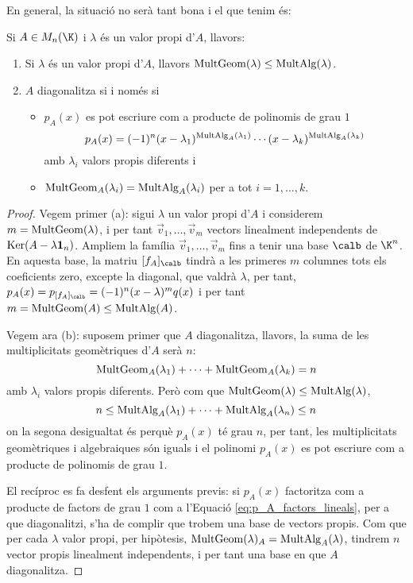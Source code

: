 En general, la situació no serà tant bona i el que tenim és:
\begin{lema}
Si $A\in M_n(\K)$ i $\lambda$ és un valor propi d'$A$, llavors:
\begin{enumerate}[\rm (a)]
    \item Si $\lambda$ és un valor propi d'$A$, llavors $\operatorname{MultGeom}(\lambda)\leq \operatorname{MultAlg}(\lambda)$.
    \item $A$ diagonalitza si i només si 
    \begin{itemize}
      \item $p_A(x)$ es pot escriure com a producte de polinomis de grau $1$
      \begin{equation}\label{eq:p_A_factors_lineals}
      p_A(x)=(-1)^n (x-\lambda_1)^{\operatorname{MultAlg}_A(\lambda_1)}\cdots(x-\lambda_k)^{\operatorname{MultAlg}_A(\lambda_k)} 
      \end{equation}
      amb $\lambda_i$ valors propis diferents i
      \item $\operatorname{MultGeom}_A(\lambda_i)=\operatorname{MultAlg}_A(\lambda_i)$ per a tot $i=1,\dots, k$.
    \end{itemize}
\end{enumerate}
\end{lema}
\begin{proof}
Vegem primer (a): sigui $\lambda$ un valor propi d'$A$ i considerem $m=\operatorname{MultGeom}(\lambda)$, i per tant $\vec v_1, \dots, \vec v_m$ vectors linealment independents de $\operatorname{Ker}(A-\lambda\mathbf{1}_n)$. Ampliem la família $\vec v_1, \dots, \vec v_m$ fins a tenir una base $\calb$ de $\K^n$. En aquesta base, la matriu $[f_A]_\calb$ tindrà a les primeres $m$ columnes tots els coeficients zero, excepte la diagonal, que valdrà $\lambda$, per tant, $p_A(x)=p_{[f_A]_\calb}=(-1)^n(x-\lambda)^m q(x)$ i per tant $m=\operatorname{MultGeom}(A)\leq\operatorname{MultAlg}(A)$.

Vegem ara (b): suposem primer que $A$ diagonalitza, llavors, la suma de les multiplicitats geomètriques d'$A$ serà $n$:
$$
\operatorname{MultGeom}_A(\lambda_1)+\cdots+\operatorname{MultGeom}_A(\lambda_k)=n
$$
amb $\lambda_i$ valors propis diferents. Però com que $\operatorname{MultGeom}(\lambda)\leq\operatorname{MultAlg}(\lambda)$, 
$$
n\leq \operatorname{MultAlg}_A(\lambda_1)+\cdots+\operatorname{MultAlg}_A(\lambda_n) \leq n
$$
on la segona desigualtat és perquè $p_A(x)$ té grau $n$, per tant, les multiplicitats geomètriques i algebraiques són iguals i el polinomi $p_A(x)$ es pot escriure com a producte de polinomis de grau $1$.

El recíproc es fa desfent els arguments previs: si $p_A(x)$ factoritza com a producte de factors de grau $1$ com a l'Equació \eqref{eq:p_A_factors_lineals}, per a que diagonalitzi, s'ha de complir que trobem una base de vectors propis. Com que per cada $\lambda$ valor propi, per hipòtesis, $\operatorname{MultGeom}(\lambda)_A=\operatorname{MultAlg}_A(\lambda)$, tindrem $n$ vector propis linealment independents, i per tant una base en que $A$ diagonalitza.
\end{proof}
